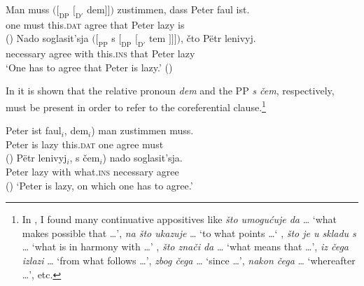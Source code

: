 \documentclass[output=paper]{langscibook}
\begin{document}
\ea\label{ex:zimmermann:8}
    \ea \gll Man muss $([_\textrm{DP}$ $[_{\textrm{D}'}$ dem$]])$ zustimmen, dass Peter faul ist.\\
    one must {} {} this.\textsc{dat} agree that Peter lazy is \\ \hfill ()
    \ex \gll Nado soglasit’sja $([_\textrm{PP}$ s $[_\textrm{DP}$ $[_{\textrm{D}'}$ tem $]]])$, čto Pëtr lenivyj. \\
    necessary agree {} with {} {} this.\textsc{ins} {} that Peter lazy \\
    \z
    \glt `One has to agree that Peter is lazy.' \hfill ()
\z

\noindent In  it is shown that the relative pronoun \textit{dem} and the PP \textit{s čem}, respectively, must be present in order to refer to the coreferential clause.\footnote{In \citet{Willer-Gold2013}, I found many continuative appositives like \textit{što umogućuje da} {\dots} `what makes possible that {\dots}', \textit{na što ukazuje} {\dots} `to what points {\dots}‘ , \textit{što je u skladu s} {\dots} `what is in harmony with {\dots}' , \textit{što znači da} {\dots} `what means that {\dots}', \textit{iz čega izlazi} {\dots} `from what follows {\dots}', \textit{zbog čega} {\dots} `since {\dots}', \textit{nakon čega} {\dots} `whereafter {\dots}', etc.}

\ea\label{ex:zimmermann:9}
    \ea \gll Peter ist faul$_i$, \minsp{*(} dem$_i$) man zustimmen muss.\\
    Peter is lazy {} this.\textsc{dat} one agree must \\ \hfill ()
    \ex \gll Pëtr lenivyj$_i$, \minsp{*(} s čem$_i$) nado soglasit'sja. \\
    Peter lazy {} with what.\textsc{ins} necessary agree \\ \hfill ()
    \z
    \glt `Peter is lazy, on which one has to agree.'
\z
\end{document}
